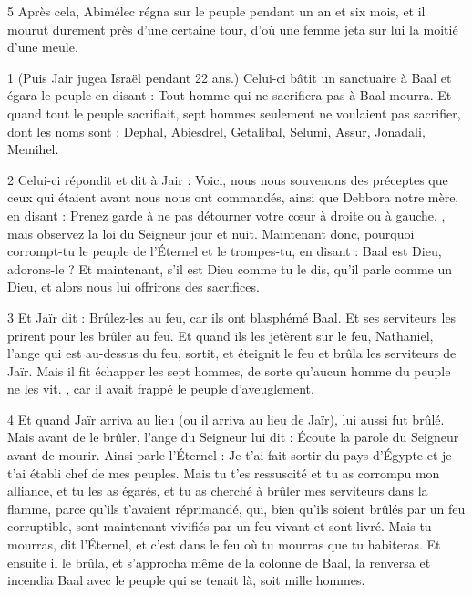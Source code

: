 \par 5 Après cela, Abimélec régna sur le peuple pendant un an et six mois, et il mourut durement près d'une certaine tour, d'où une femme jeta sur lui la moitié d'une meule.

\par [Un espace de longueur incertaine dans le texte.]


\par 1 (Puis Jair jugea Israël pendant 22 ans.) Celui-ci bâtit un sanctuaire à Baal et égara le peuple en disant : Tout homme qui ne sacrifiera pas à Baal mourra. Et quand tout le peuple sacrifiait, sept hommes seulement ne voulaient pas sacrifier, dont les noms sont : Dephal, Abiesdrel, Getalibal, Selumi, Assur, Jonadali, Memihel.

\par 2 Celui-ci répondit et dit à Jair : Voici, nous nous souvenons des préceptes que ceux qui étaient avant nous nous ont commandés, ainsi que Debbora notre mère, en disant : Prenez garde à ne pas détourner votre cœur à droite ou à gauche. , mais observez la loi du Seigneur jour et nuit. Maintenant donc, pourquoi corrompt-tu le peuple de l’Éternel et le trompes-tu, en disant : Baal est Dieu, adorons-le ? Et maintenant, s'il est Dieu comme tu le dis, qu'il parle comme un Dieu, et alors nous lui offrirons des sacrifices.

\par 3 Et Jaïr dit : Brûlez-les au feu, car ils ont blasphémé Baal. Et ses serviteurs les prirent pour les brûler au feu. Et quand ils les jetèrent sur le feu, Nathaniel, l'ange qui est au-dessus du feu, sortit, et éteignit le feu et brûla les serviteurs de Jaïr. Mais il fit échapper les sept hommes, de sorte qu'aucun homme du peuple ne les vit. , car il avait frappé le peuple d'aveuglement.

\par 4 Et quand Jaïr arriva au lieu (ou il arriva au lieu de Jaïr), lui aussi fut brûlé. Mais avant de le brûler, l'ange du Seigneur lui dit : Écoute la parole du Seigneur avant de mourir. Ainsi parle l'Éternel : Je t'ai fait sortir du pays d'Égypte et je t'ai établi chef de mes peuples. Mais tu t'es ressuscité et tu as corrompu mon alliance, et tu les as égarés, et tu as cherché à brûler mes serviteurs dans la flamme, parce qu'ils t'avaient réprimandé, qui, bien qu'ils soient brûlés par un feu corruptible, sont maintenant vivifiés par un feu vivant et sont livré. Mais tu mourras, dit l'Éternel, et c'est dans le feu où tu mourras que tu habiteras. Et ensuite il le brûla, et s'approcha même de la colonne de Baal, la renversa et incendia Baal avec le peuple qui se tenait là, soit mille hommes.

